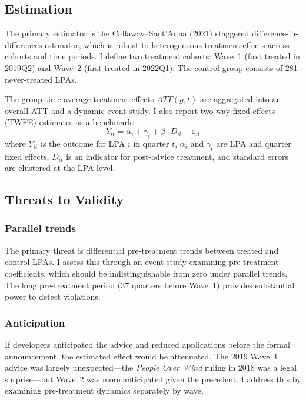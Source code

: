 \documentclass[12pt]{article}
\begin{document}
\subsection{Estimation}

The primary estimator is the Callaway--Sant'Anna (2021) staggered difference-in-differences estimator, which is robust to heterogeneous treatment effects across cohorts and time periods. I define two treatment cohorts: Wave~1 (first treated in 2019Q2) and Wave~2 (first treated in 2022Q1). The control group consists of 281 never-treated LPAs.

The group-time average treatment effects $ATT(g,t)$ are aggregated into an overall ATT and a dynamic event study. I also report two-way fixed effects (TWFE) estimates as a benchmark:
\begin{equation}
Y_{it} = \alpha_i + \gamma_t + \beta \cdot D_{it} + \varepsilon_{it}
\label{eq:twfe}
\end{equation}
where $Y_{it}$ is the outcome for LPA $i$ in quarter $t$, $\alpha_i$ and $\gamma_t$ are LPA and quarter fixed effects, $D_{it}$ is an indicator for post-advice treatment, and standard errors are clustered at the LPA level.

\subsection{Threats to Validity}

\subsubsection*{Parallel trends} The primary threat is differential pre-treatment trends between treated and control LPAs. I assess this through an event study examining pre-treatment coefficients, which should be indistinguishable from zero under parallel trends. The long pre-treatment period (37 quarters before Wave~1) provides substantial power to detect violations.

\subsubsection*{Anticipation} If developers anticipated the advice and reduced applications before the formal announcement, the estimated effect would be attenuated. The 2019 Wave~1 advice was largely unexpected---the \textit{People Over Wind} ruling in 2018 was a legal surprise---but Wave~2 was more anticipated given the precedent. I address this by examining pre-treatment dynamics separately by wave.
\end{document}
